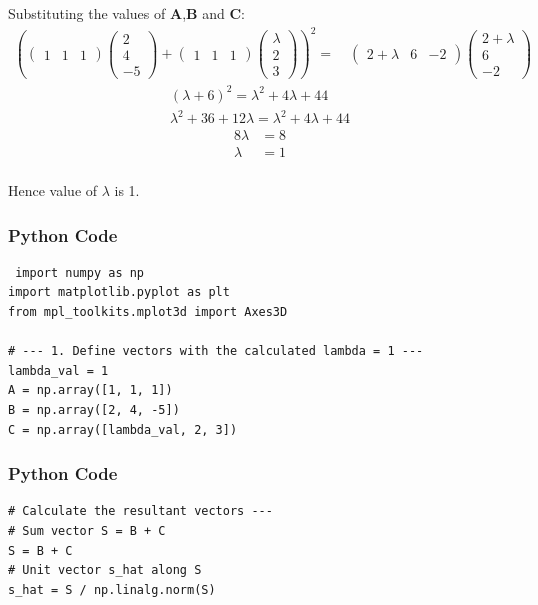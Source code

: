 \documentclass{beamer}
\begin{document}
\begin{frame}
 Substituting the values of \textbf{A},\textbf{B} and \textbf{C}: 
\begin{align}
\left(\begin{pmatrix}1 & 1 & 1\end{pmatrix}  \begin{pmatrix}2 \\4 \\-5\end{pmatrix}+\begin{pmatrix}1 & 1 & 1\end{pmatrix} \begin{pmatrix}\lambda \\2 \\3\end{pmatrix}\right)^2=
\quad\begin{pmatrix}2+\lambda & 6 & -2\end{pmatrix}\begin{pmatrix}2+\lambda \\6 \\-2\end{pmatrix}
\end{align}
\begin{align}
(\lambda+6)^2 = \lambda^2 
+ 4\lambda+44\\
\lambda^2 + 36 + 12\lambda = \lambda^2 + 4\lambda + 44  
\end{align}
\begin{align}8\lambda &= 8 \\\lambda &= 1\end{align}\\
    
Hence value of $\lambda$ is 1.
\end{frame}


\begin{frame}[fragile]
    \frametitle{Python Code}
    \begin{lstlisting}
 import numpy as np
import matplotlib.pyplot as plt
from mpl_toolkits.mplot3d import Axes3D

# --- 1. Define vectors with the calculated lambda = 1 ---
lambda_val = 1
A = np.array([1, 1, 1])
B = np.array([2, 4, -5])
C = np.array([lambda_val, 2, 3])
\end{lstlisting}
\end{frame}

\begin{frame}[fragile]
    \frametitle{Python Code}

    \begin{lstlisting}
# Calculate the resultant vectors ---
# Sum vector S = B + C
S = B + C
# Unit vector s_hat along S
s_hat = S / np.linalg.norm(S)
    \end{lstlisting}
\end{frame}
\end{document}
